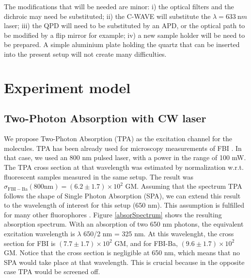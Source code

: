 \documentclass{article}
\begin{document}
The modifications that will be needed are minor: i) the optical filters and the dichroic may need be substituted; ii) the C-WAVE will substitute the $\lambda=\SI{633}{\nano m}$ laser; iii) the QPD will need to be substituted by an APD, or the optical path to be modified by a flip mirror for example; iv) a new sample holder will be need to be prepared. A simple aluminium plate holding the quartz that can be inserted into the present setup will not create many difficulties.



\section{Experiment model}

\subsection{Two-Photon Absorption with CW laser}
We propose Two-Photon Absorption (TPA) as the excitation channel for the molecules. TPA has been already used for microscopy measurements of FBI \cite{rivilla_fluorescent_2020}. In that case, we used an 800 nm pulsed laser, with a power in the range of 100 mW. The TPA cross section at that wavelength was estimated by normalization w.r.t. fluorescent samples measured in the same setup. The result was $\sigma_{\mathrm{FBI-Ba}}(800\mathrm{ nm}) = (6.2 \pm 1.7)\times 10^2$ GM. Assuming that the spectrum TPA follows the shape of Single Photon Absorption (SPA), we can extend this result to the wavelength of interest for this setup (650 nm). This assumption is fulfilled for many other fluorophores \cite{2PA_crosssection_fluorophores}. Figure \ref{absorSpectrum} shows the resulting absorption spectrum. With an absorption of two 650 nm photons, the equivalent excitation wavelength is $\lambda$ 650/2 nm = 325 nm. At this wavelenght, the cross section for FBI is $(7.7 \pm 1.7)\times 10^2$ GM, and for FBI-Ba, $(9.6 \pm 1.7)\times 10^2$ GM. Notice that the cross section is negligible at 650 nm, which means that no SPA would take place at that wavelength. This is crucial because in the opposite case TPA would be screened off.
\end{document}
